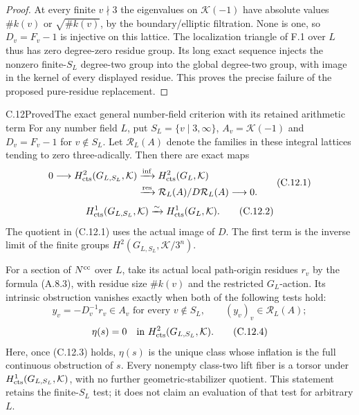 \begin{proof}
At every finite $v\nmid3$ the eigenvalues on
$\mathcal K(-1)$ have absolute values
$\#k(v)$ or $\sqrt{\#k(v)}$, by the boundary/elliptic
filtration.  None is one, so
$D_v=F_v-1$ is injective on this lattice.
The localization triangle of F.1 over $L$ thus has
zero degree-zero residue group.  Its long exact
sequence injects the nonzero finite-$S_L$ degree-two
group into the global degree-two group, with image
in the kernel of every displayed residue.
This proves the precise failure of the proposed
pure-residue replacement.
\end{proof}

\begin{statement}{C.12}{Proved}{The exact general number-field criterion with its retained arithmetic term}
For any number field $L$, put $S_L=\{v\mid3,\infty\}$,
$A_v=\mathcal K(-1)$ and $D_v=F_v-1$ for $v\notin S_L$.
Let $\mathcal R_L(A)$ denote the families in these
integral lattices tending to zero three-adically.
Then there are exact maps
\[
\begin{aligned}
 0\longrightarrow H^2_{\rm cts}(G_{L,S_L},\mathcal K)
 &\xrightarrow{\rm inf}H^2_{\rm cts}(G_L,\mathcal K)\\
 &\xrightarrow{\rm res}
       \mathcal R_L(A)/D\mathcal R_L(A)
       \longrightarrow0.
\end{aligned}                                              \tag{C.12.1}
\]
\[
 H^1_{\rm cts}(G_{L,S_L},\mathcal K)
 \xrightarrow{\sim}H^1_{\rm cts}(G_L,\mathcal K).             \tag{C.12.2}
\]
The quotient in (C.12.1) uses the actual image of $D$.
The first term is the inverse limit of the finite
groups $H^2(G_{L,S_L},\mathcal K/3^n)$.

For a section of $N^{\rm cc}$ over $L$, take its
actual local path-origin residues $r_v$ by the
formula (A.8.3), with residue size $\#k(v)$ and the
restricted $G_L$-action.  Its intrinsic obstruction
vanishes exactly when both of the following tests hold:
\[
 y_v=-D_v^{-1}r_v\in A_v\text{ for every }v\notin S_L,
        \qquad (y_v)_v\in\mathcal R_L(A);                  \tag{C.12.3}
\]
\[
 \eta(s)=0\quad\text{in }H^2_{\rm cts}(G_{L,S_L},\mathcal K).
                                                               \tag{C.12.4}
\]
Here, once (C.12.3) holds, $\eta(s)$ is the unique
class whose inflation is the full continuous
obstruction of $s$.  Every nonempty class-two lift
fiber is a torsor under
$H^1_{\rm cts}(G_{L,S_L},\mathcal K)$, with no further
geometric-stabilizer quotient.
This statement retains the finite-$S_L$ test; it
does not claim an evaluation of that test for
arbitrary $L$.
\end{statement}
